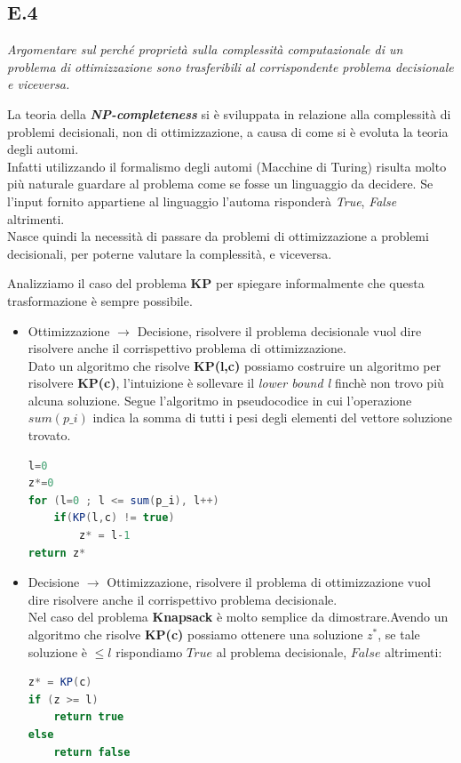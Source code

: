 \documentclass[a4paper]{article}
\newcommand{\imp}[1]{\textbf{\textit{#1}}}
\begin{document}
\subsection{E.4}
\emph{Argomentare sul perché proprietà sulla complessità computazionale di un problema di ottimizzazione sono trasferibili al corrispondente problema decisionale e viceversa.}


La teoria della \imp{NP-completeness} si è sviluppata in relazione alla complessità di problemi decisionali, non di ottimizzazione, a causa di come si è evoluta la teoria degli automi.\\
Infatti utilizzando il formalismo degli automi (Macchine di Turing) risulta molto più naturale guardare al problema come se fosse un linguaggio da decidere. Se l'input fornito appartiene al linguaggio l'automa risponderà \textit{True}, \textit{False} altrimenti.\\
Nasce quindi la necessità di passare da problemi di ottimizzazione a problemi decisionali, per poterne valutare la complessità, e viceversa.

Analizziamo il caso del problema \textbf{KP} per spiegare informalmente che questa trasformazione è sempre possibile.
\begin{itemize}
	\item Ottimizzazione $\rightarrow$ Decisione, risolvere il problema decisionale vuol dire risolvere anche il corrispettivo problema di ottimizzazione.\\
	Dato un algoritmo che risolve \textbf{KP(l,c)} possiamo costruire un algoritmo per risolvere \textbf{KP(c)}, l'intuizione è sollevare il \textit{lower bound l} finchè non trovo più alcuna soluzione.
Segue l'algoritmo in pseudocodice in cui l'operazione $sum(p\_i)$ indica la somma di tutti i pesi degli elementi del vettore soluzione trovato.
\begin{lstlisting}[xleftmargin=15pt, language=Java ]
l=0
z*=0
for (l=0 ; l <= sum(p_i), l++)
    if(KP(l,c) != true)
        z* = l-1
return z*
\end{lstlisting}
\item Decisione $\rightarrow$ Ottimizzazione, risolvere il problema di ottimizzazione vuol dire risolvere anche il corrispettivo problema decisionale.\\
	Nel caso del problema \textbf{Knapsack} è molto semplice da dimostrare.Avendo un algoritmo che risolve \textbf{KP(c)} possiamo ottenere una soluzione $z^*$, se tale soluzione è $\leq l$ rispondiamo $True$ al problema decisionale, $False$ altrimenti:

\begin{lstlisting}[xleftmargin=15pt, language=Java ]
z* = KP(c)
if (z >= l)
    return true
else
    return false
\end{lstlisting}
\end{itemize}
\end{document}
